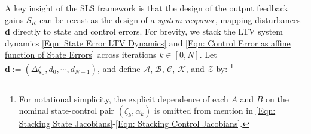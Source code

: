 \documentclass[letterpaper, 10 pt, conference]{ieeeconf}
\newcommand{\A}{\mathcal{A}}
\newcommand{\B}{\mathcal{B}}
\newcommand{\C}{\mathcal{C}}
\newcommand{\K}{\mathcal{K}}
\newcommand{\R}{\mathbb{R}}
\newcommand{\Z}{\mathcal{Z}}
\newcommand{\?}{\stackrel{?}{=}}
\newcommand{\paramDim}{d}
\newcommand{\varDim}{n}
\newcommand{\ratePGDStacked}{\boldsymbol{\ratePGD}}
\newcommand{\ratePGDErrorStacked}{\Delta\ratePGDStacked}
\newcommand{\disturbance}{d}
\newcommand{\disturbanceStacked}{\boldsymbol{\disturbance}}
\newcommand{\ratePGD}{\alpha}
\newcommand{\feedbackGain}{K}
\newcommand{\setFeedbackGains}{S_\feedbackGain}
\newcommand{\feedbackGainStacked}{\K}
\newcommand{\downshift}{\Z}
\newcommand{\jacobianState}{A}
\newcommand{\jacobianControl}{B}
\newcommand{\jacobianStateStacked}{\A}
\newcommand{\jacobianControlStacked}{\B}
\newcommand{\outputMatrixStacked}{\C}
\newcommand{\iterationHorizon}{N}
\newcommand{\state}{\zeta}
\newcommand{\stateStacked}{\boldsymbol{\state}}
\newcommand{\stateError}{\Delta\state}
\newcommand{\stateErrorStacked}{\Delta\stateStacked}
\begin{document}
A key insight of the SLS framework is that the design of the output feedback gains $\setFeedbackGains$ can be recast as the design of a \textit{system response}, mapping disturbances $\disturbanceStacked$ directly to state and control errors.
For brevity, we stack the LTV system dynamics \eqref{Eqn: State Error LTV Dynamics} and \eqref{Eqn: Control Error as affine function of State Errors} across iterations $k \in [0, \iterationHorizon]$. 
Let $\disturbanceStacked := (\stateError_0, \disturbance_0, \cdots, \disturbance_{\iterationHorizon-1})$, and define 
$\jacobianStateStacked$, $\jacobianControlStacked$, $\outputMatrixStacked$, $\feedbackGainStacked$, and $\downshift$ by:
\footnote{For notational simplicity, the explicit dependence of each $\jacobianState$ and $\jacobianControl$ on the nominal state-control pair $(\state_k, \ratePGD_k)$ is omitted from mention in \eqref{Eqn: Stacking State Jacobians}-\eqref{Eqn: Stacking Control Jacobians}.
}
\end{document}
